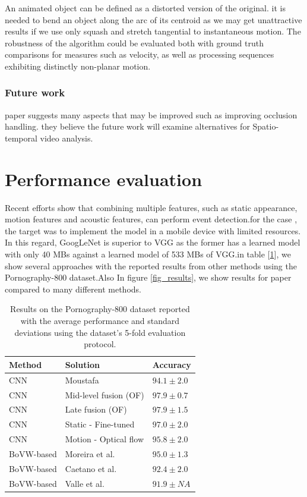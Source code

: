 \documentclass[runningheads]{llncs}
\begin{document}
An animated object can be defined as a distorted version of the original. it is needed to bend an object along the arc of its centroid as we may get unattractive results if we use only squash and stretch tangential to instantaneous motion. The robustness of the algorithm could be evaluated both with ground truth comparisons for measures such as velocity, as well as processing sequences exhibiting distinctly non-planar motion.\\

\subsubsection{Future work}
paper \cite{collomosse2003video} suggests many aspects that may be improved such as improving occlusion handling. they believe the future work will examine alternatives for Spatio-temporal video analysis.\\

\section{Performance evaluation}
Recent efforts show that combining multiple features, such as static appearance, motion features and acoustic features, can perform event detection.for the case \cite{perez2017video}, the target was to implement the model in a mobile device with limited resources. In this regard, GoogLeNet is superior to VGG as the former has a learned model with only 40 MBs against a learned model of 533 MBs of VGG.in table  [\ref{tab_results}], we show several approaches with the reported results from other methods using the Pornography-800 dataset.Also In figure \ref{fig_results}, we show results for paper \cite{jin2018pornographic} compared to many different methods. \\

\begin{table}
\caption{Results on the Pornography-800 dataset reported with the average performance and standard deviations using the dataset's 5-fold evaluation protocol.}
\label{tab_results}
\begin{tabular}{|p{5cm}|p{4cm}|p{3cm}|}
\hline
Method & Solution & Accuracy \\
\hline
CNN & Moustafa\cite{moustafa2015applying} & $94.1 \pm 2.0$ \\
\hline
CNN & Mid-level fusion (OF) & $97.9 \pm 0.7$ \\
\hline
CNN & Late fusion (OF) & $97.9 \pm 1.5$ \\
\hline
CNN & Static - Fine-tuned & $97.0 \pm 2.0$  \\
\hline
CNN & Motion - Optical flow & $95.8 \pm 2.0 $ \\
\hline
BoVW-based & Moreira et al.\cite{moreira2016pornography} & $95.0 \pm 1.3$ \\
\hline
BoVW-based & Caetano et al.\cite{caetano2016mid} & $92.4 \pm 2.0$ \\
\hline
BoVW-based & Valle et al.\cite{valle2011content} & $91.9 \pm NA$ \\
\hline

\end{tabular}
\end{table}
\end{document}
